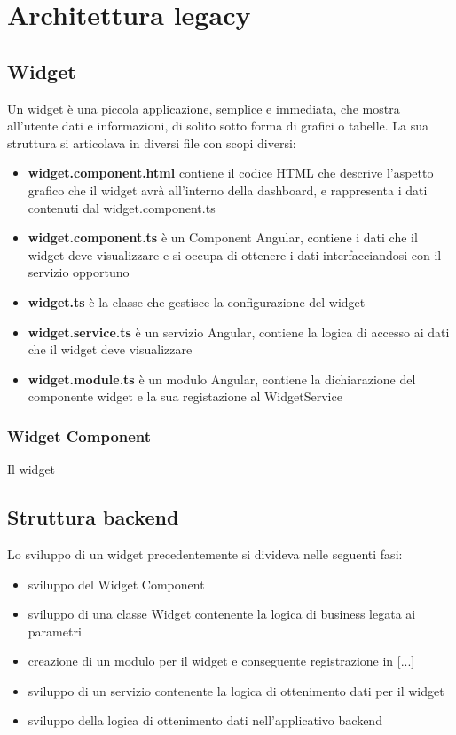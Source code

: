 \chapter{Architettura legacy}
\section{Widget}
Un widget è una piccola applicazione, semplice e immediata, che mostra all'utente dati e informazioni, di solito sotto forma di grafici o tabelle.
La sua struttura si articolava in diversi file con scopi diversi:
\begin{itemize}
\item \textbf{widget.component.html} contiene il codice HTML che descrive l'aspetto grafico che il widget avrà all'interno della dashboard, e rappresenta i dati contenuti dal widget.component.ts
\item \textbf{widget.component.ts} è un Component Angular, contiene i dati che il widget deve visualizzare e si occupa di ottenere i dati interfacciandosi con il servizio opportuno
\item \textbf{widget.ts} è la classe che gestisce la configurazione del widget
\item \textbf{widget.service.ts} è un servizio Angular, contiene la logica di accesso ai dati che il widget deve visualizzare
\item \textbf{widget.module.ts} è un modulo Angular, contiene la dichiarazione del componente widget e la sua registazione al WidgetService
\end{itemize}

\subsection{Widget Component}
Il widget

\section{Struttura backend}
Lo sviluppo di un widget precedentemente si divideva nelle seguenti fasi:
\begin{itemize}
\item sviluppo del Widget Component
\item sviluppo di una classe Widget contenente la logica di business legata ai parametri
\item creazione di un modulo per il widget e conseguente registrazione in [...]
\item sviluppo di un servizio contenente la logica di ottenimento dati per il widget
\item sviluppo della logica di ottenimento dati nell'applicativo backend
\end{itemize}
